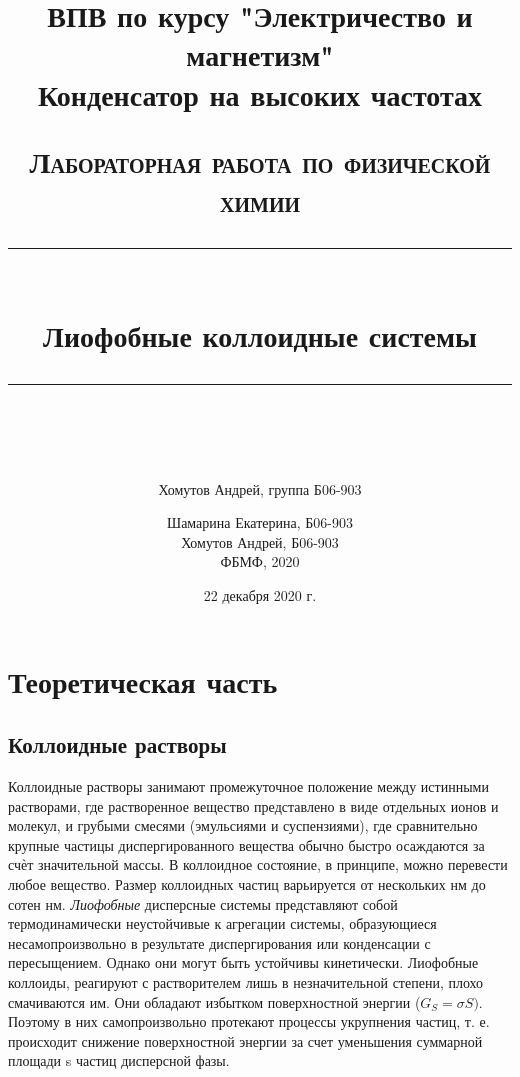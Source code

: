 \documentclass[a4paper, 12pt]{article}
\author{Хомутов Андрей, группа Б06-903}
\title{ВПВ по курсу "Электричество и магнетизм" \\ Конденсатор на высоких частотах}
\date{22 декабря 2020 г.}
\newcommand{\HRule}[1]{\rule{\linewidth}{#1}}
\begin{document}
\title{ \normalsize \textsc{Лабораторная работа по физической химии}
		\\ [4.0cm]
		\HRule{0.5pt} \\ [0.3cm]
		\LARGE \textbf{{Лиофобные коллоидные системы}}
		\HRule{0.5pt} \\ [0.1cm]
		\normalsize  \vspace*{20\baselineskip}}

\date{}

\author{Шамарина Екатерина, Б06-903 \\
		Хомутов Андрей, Б06-903 \\
ФБМФ, 2020\\ }

\maketitle
\thispagestyle{empty}
\newpage

 
\section{Теоретическая часть}
\subsection{Коллоидные растворы}
Коллоидные растворы занимают промежуточное положение между истинными
растворами, где растворенное вещество представлено в виде отдельных ионов и молекул,
и грубыми смесями (эмульсиями и суспензиями), где сравнительно крупные частицы
диспергированного вещества обычно быстро осаждаются за счѐт значительной массы. В
коллоидное состояние, в принципе, можно перевести любое вещество. Размер коллоидных
частиц варьируется от нескольких нм до сотен нм. \textit{Лиофобные} дисперсные
системы представляют собой термодинамически неустойчивые к агрегации
системы, образующиеся несамопроизвольно в результате диспергирования или
конденсации с пересыщением. Однако они могут быть устойчивы кинетически.
Лиофобные коллоиды, реагируют с растворителем лишь в незначительной степени, плохо
смачиваются им. Они обладают избытком поверхностной
энергии ($G_{S} = \sigma S)$. Поэтому в них самопроизвольно протекают процессы укрупнения
частиц, т. е. происходит снижение поверхностной энергии за счет уменьшения суммарной
площади s частиц дисперсной фазы.
\end{document}
